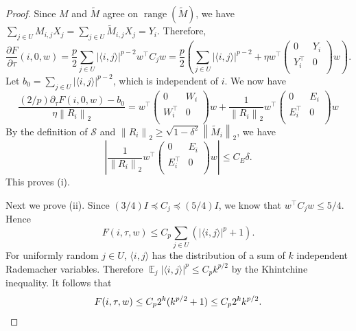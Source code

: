 \documentclass[10pt,a4paper]{amsart}
\DeclareMathOperator*{\E}{\mathbb{E}}
\newcommand{\cS}{\mathcal{S}}
\newcommand{\ip}[2]{\langle #1,#2\rangle}
\newcommand{\norm}[1]{\left\|#1\right\|}
\DeclareMathOperator{\range}{range}
\begin{document}
\begin{proof}
	Since $M$ and $\widetilde{M}$ agree on $\range(\widetilde{M})$, we have
	$\sum_{j\in U} M_{i,j} X_j = \sum_{j\in U}\widetilde{M}_{i,j}X_j = Y_i$. Therefore,
	\[
		\frac{\partial F}{\partial \tau}(i,0,w)
		= \frac{p}{2}\sum_{j\in U}|\langle i,j\rangle|^{p-2} w^\top C_j w 
		= \frac{p}{2}\left( \sum_{j\in U}|\langle i,j\rangle|^{p-2} + \eta w^\top \begin{pmatrix}
			0 & Y_i \\	Y_i^\top & 0 \\
		\end{pmatrix} w \right).
	\]
	Let $b_0 = \sum_{j\in U} |\ip{i}{j}|^{p-2}$, which is independent of $i$. We now have
	\[
		\frac{(2/p)\partial_\tau F(i,0,w) - b_0}{\eta\norm{R_i}_2} = w^\top \begin{pmatrix}
			0 & W_i \\	W_i^\top & 0 \\
		\end{pmatrix} w + \frac{1}{\norm{R_i}_2}
		w^\top \begin{pmatrix}
			0 & E_i \\	E_i^\top & 0 \\
		\end{pmatrix} w
	\]
	By the definition of $\cS$ and $\norm{R_i}_2\geq \sqrt{1-\delta^2}\norm{\widetilde{M}_i}_2$, we have
	\[
		\left| \frac{1}{\norm{R_i}_2}
			w^\top \begin{pmatrix}
				0 & E_i \\	E_i^\top & 0 \\
			\end{pmatrix} w \right| \leq C_E\delta.
	\]
	This proves (i).
	
	Next we prove (ii). Since $(3/4)I \preceq C_j\preceq (5/4)I$, we know that $w^\top C_j w \leq 5/4$. Hence
	\[
		F(i,\tau,w) \leq C_p\sum_{j\in U}\left(|\ip{i}{j}|^p+1\right).
	\]
	For uniformly random $j\in U$, $\ip{i}{j}$ has the distribution of a sum of $k$ independent Rademacher variables. Therefore $\E_j|\ip{i}{j}|^p\leq C_p k^{p/2}$ by the Khintchine inequality. It follows that
	\[
		F(i,\tau,w) \leq C_p2^k(k^{p/2}+1) \leq C_p2^k k^{p/2}. \qedhere
	\]
\end{proof}
\end{document}
